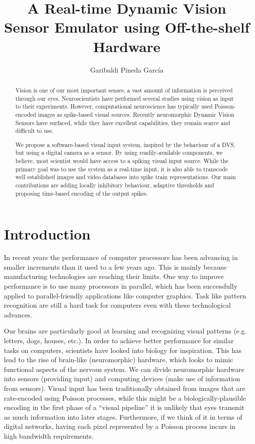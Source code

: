 \documentclass[twocolumn]{article}
\title{A Real-time Dynamic Vision Sensor Emulator using Off-the-shelf Hardware}
\author{Garibaldi Pineda García}
\begin{document}
\maketitle
  \begin{abstract}
  Vision is one of our most important senses, a vast amount of information is perceived through our eyes. Neuroscientists have performed several studies using vision as input to their experiments. However, computational neuroscience has typically used Poisson-encoded images as spike-based visual sources. Recently neuromorphic Dynamic Vision Sensors have surfaced, while they have excellent capabilities, they remain scarce and difficult to use.
  
  We propose a software-based visual input system, inspired by the behaviour of a DVS, but using a digital camera as a sensor. By using readily-available components, we believe, most scientist would have access to a spiking visual input source. While the primary goal was to use the system as a real-time input, it is also able to transcode well established images and video databases into spike train representations. Our main contributions are adding locally inhibitory behaviour, adaptive thresholds and proposing time-based encoding of the output spikes.
  
  \end{abstract}

  \section{Introduction}
  
  In recent years the performance of computer processors has been advancing in smaller increments than it used to a few years ago. This is mainly because manufacturing technologies are reaching their limits. One way to improve performance is to use many processors in parallel, which has been successfully applied to parallel-friendly applications like computer graphics. Task like pattern recognition are still a hard task for computers even with these technological advances.
  
  Our brains are particularly good at learning and recognizing visual patterns (e.g. letters, dogs, houses, etc.). In order to achieve better performance for similar tasks on computers, scientists have looked into biology for inspiration. This has lead to the rise of brain-like (neuromorphic) hardware, which looks to mimic functional aspects of the nervous system. We can divide neuromorphic hardware into sensors (providing input) and computing devices (make use of information from sensors). Visual input has been traditionally obtained from images that are rate-encoded using Poisson processes, while this might be a biologically-plausible encoding in the first phase of a ``visual pipeline'' it is unlikely that eyes transmit as much information into later stages. Furthermore, if we think of it in terms of digital networks, having each pixel represented by a Poisson process incurs in high bandwidth requirements. 
  
\end{document}
